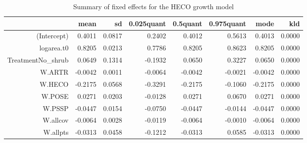 \begin{table}[ht]
\centering
\caption{Summary of fixed effects for the HECO growth model} 
\label{HECOgrowth}
\begin{tabular}{rrrrrrrr}
  \hline
 & mean & sd & 0.025quant & 0.5quant & 0.975quant & mode & kld \\ 
  \hline
(Intercept) & 0.4011 & 0.0817 & 0.2402 & 0.4012 & 0.5613 & 0.4013 & 0.0000 \\ 
  logarea.t0 & 0.8205 & 0.0213 & 0.7786 & 0.8205 & 0.8623 & 0.8205 & 0.0000 \\ 
  TreatmentNo\_shrub & 0.0649 & 0.1314 & -0.1932 & 0.0650 & 0.3227 & 0.0650 & 0.0000 \\ 
  W.ARTR & -0.0042 & 0.0011 & -0.0064 & -0.0042 & -0.0021 & -0.0042 & 0.0000 \\ 
  W.HECO & -0.2175 & 0.0568 & -0.3291 & -0.2175 & -0.1060 & -0.2175 & 0.0000 \\ 
  W.POSE & 0.0271 & 0.0203 & -0.0128 & 0.0271 & 0.0670 & 0.0271 & 0.0000 \\ 
  W.PSSP & -0.0447 & 0.0154 & -0.0750 & -0.0447 & -0.0144 & -0.0447 & 0.0000 \\ 
  W.allcov & -0.0064 & 0.0028 & -0.0119 & -0.0064 & -0.0010 & -0.0064 & 0.0000 \\ 
  W.allpts & -0.0313 & 0.0458 & -0.1212 & -0.0313 & 0.0585 & -0.0313 & 0.0000 \\ 
   \hline
\end{tabular}
\end{table}

